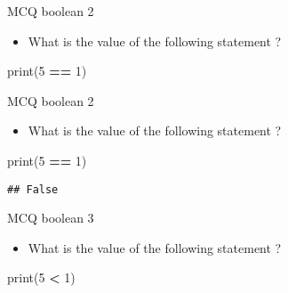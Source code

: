 \documentclass[
  8pt,
  ignorenonframetext,
]{beamer}
\newenvironment{Shaded}{\begin{snugshade}}{\end{snugshade}}
\newcommand{\BuiltInTok}[1]{#1}
\newcommand{\DecValTok}[1]{\textcolor[rgb]{0.00,0.00,0.81}{#1}}
\newcommand{\NormalTok}[1]{#1}
\newcommand{\OperatorTok}[1]{\textcolor[rgb]{0.81,0.36,0.00}{\textbf{#1}}}
\providecommand{\tightlist}{%
  \setlength{\itemsep}{0pt}\setlength{\parskip}{0pt}}
\begin{document}
\begin{frame}[fragile]{MCQ boolean 2}
\protect\hypertarget{mcq-boolean-2}{}
\begin{itemize}
\tightlist
\item
  What is the value of the following statement ?
\end{itemize}

\begin{Shaded}
\begin{Highlighting}[]
\BuiltInTok{print}\NormalTok{(}\DecValTok{5} \OperatorTok{==} \DecValTok{1}\NormalTok{)}
\end{Highlighting}
\end{Shaded}
\end{frame}

\begin{frame}[fragile]{MCQ boolean 2}
\protect\hypertarget{mcq-boolean-2-1}{}
\begin{itemize}
\tightlist
\item
  What is the value of the following statement ?
\end{itemize}

\begin{Shaded}
\begin{Highlighting}[]
\BuiltInTok{print}\NormalTok{(}\DecValTok{5} \OperatorTok{==} \DecValTok{1}\NormalTok{)}
\end{Highlighting}
\end{Shaded}

\begin{verbatim}
## False
\end{verbatim}
\end{frame}

\begin{frame}[fragile]{MCQ boolean 3}
\protect\hypertarget{mcq-boolean-3}{}
\begin{itemize}
\tightlist
\item
  What is the value of the following statement ?
\end{itemize}

\begin{Shaded}
\begin{Highlighting}[]
\BuiltInTok{print}\NormalTok{(}\DecValTok{5} \OperatorTok{\textless{}} \DecValTok{1}\NormalTok{)}
\end{Highlighting}
\end{Shaded}
\end{frame}
\end{document}

